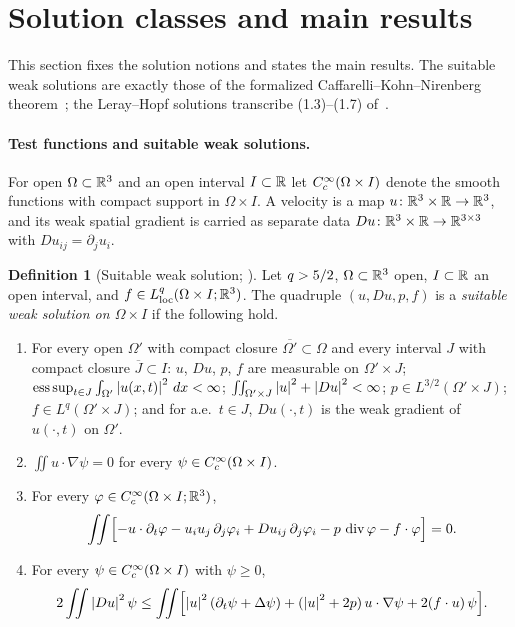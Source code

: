 \documentclass[11pt,letterpaper]{article}
\numberwithin{equation}{section}
\theoremstyle{plain}
\theoremstyle{definition}
\newtheorem{definition}[theorem]{Definition}
\theoremstyle{remark}
\begin{document}
\section{Solution classes and main results}\label{sec:leray-hopf}

This section fixes the solution notions and states the main results. The
suitable weak solutions are exactly those of the formalized
Caffarelli--Kohn--Nirenberg theorem~\cite{CKNLean}; the Leray--Hopf solutions
transcribe (1.3)--(1.7) of~\cite{ESS2003}.

\paragraph{Test functions and suitable weak solutions.}
For open $\Omega\subset\mathbb{R}^3$ and an open interval $I\subset\mathbb{R}$ let
$C_c^\infty(\Omega\times I)$ denote the smooth functions with compact support in
$\Omega\times I$. A velocity is a map $u\colon\mathbb{R}^3\times\mathbb{R}\to\mathbb{R}^3$, and its
weak spatial gradient is carried as separate data
$Du\colon\mathbb{R}^3\times\mathbb{R}\to\mathbb{R}^{3\times3}$ with $Du_{ij}=\partial_j u_i$.

\begin{definition}[Suitable weak solution; {\cite[Definition~1.5]{CKNLean}}]\label{def:sws}
Let $q>5/2$, $\Omega\subset\mathbb{R}^3$ open, $I\subset\mathbb{R}$ an open interval, and
$f\in L^{q}_{\mathrm{loc}}(\Omega\times I;\mathbb{R}^3)$. The quadruple $(u,Du,p,f)$ is a
\emph{suitable weak solution on $\Omega\times I$} if the following hold.
\begin{enumerate}[label=(S\arabic*)]
\item For every open $\Omega'$ with compact closure
  $\overline{\Omega'}\subset\Omega$ and every interval $J$ with compact closure
  $\overline J\subset I$: $u$, $Du$, $p$, $f$ are measurable on
  $\Omega'\times J$;
  $\operatorname*{ess\,sup}_{t\in J}\int_{\Omega'}\left\lvert u(x,t)\right\rvert^2\,dx<\infty$;
  $\iint_{\Omega'\times J}\left\lvert u\right\rvert^2+\left\lvert Du\right\rvert^2<\infty$;
  $p\in L^{3/2}(\Omega'\times J)$; $f\in L^q(\Omega'\times J)$; and for
  a.e.\ $t\in J$, $Du(\cdot,t)$ is the weak gradient of $u(\cdot,t)$ on
  $\Omega'$.
\item $\iint u\cdot\nabla\psi=0$ for every $\psi\in C_c^\infty(\Omega\times I)$.
\item For every $\varphi\in C_c^\infty(\Omega\times I;\mathbb{R}^3)$,
  \[
  \iint\Bigl[-u\cdot\partial_t\varphi-u_iu_j\,\partial_j\varphi_i+Du_{ij}\,\partial_j\varphi_i
    -p\,\operatorname{div}\varphi-f\cdot\varphi\Bigr]=0 .
  \]
\item For every $\psi\in C_c^\infty(\Omega\times I)$ with $\psi\ge0$,
  \[
  2\iint\left\lvert Du\right\rvert^2\psi\le\iint\Bigl[\left\lvert u\right\rvert^2(\partial_t\psi+\Delta\psi)
    +(\left\lvert u\right\rvert^2+2p)\,u\cdot\nabla\psi+2(f\cdot u)\,\psi\Bigr].
  \]
\end{enumerate}
\end{definition}
\end{document}
